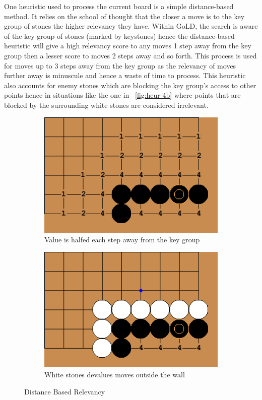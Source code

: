 \documentclass{l4proj}
\begin{document}
One heuristic used to process the current board is a simple distance-based method. It relies on the school of thought that the closer a move is to the key group of stones the higher relevancy they have. Within GoLD, the search is aware of the key group of stones (marked by keystones) hence the distance-based heuristic will give a high relevancy score to any moves 1 step away from the key group then a lesser score to moves 2 steps away and so forth. This process is used for moves up to 3 steps away from the key group as the relevancy of moves further away is minuscule and hence a waste of time to process. This heuristic also accounts for enemy stones which are blocking the key group's access to other points hence in situations like the one in ~\autoref{fig:heur-4b} where points that are blocked by the surrounding white stones are considered irrelevant.

\begin{figure}[!ht]
\centering
\begin{subfigure}[b]{0.45\textwidth}
\centering
\includegraphics[width=\textwidth]{heur/4a.png}
\caption{Value is halfed each step away from the key group}
\label{fig:heur-4a}
\end{subfigure}
\begin{subfigure}[b]{0.45\textwidth}
\centering
\includegraphics[width=\textwidth]{heur/4b.png}
\caption{White stones devalues moves outside the wall}
\label{fig:heur-4b}
\end{subfigure}
\caption{Distance Based Relevancy}
\label{fig:heur-4}
\end{figure}
\end{document}
